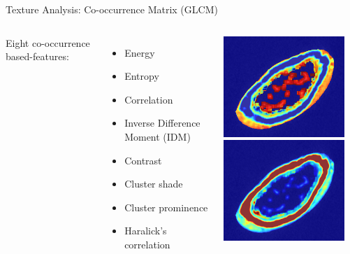 \documentclass[10pt,aspectratio=169]{beamer}
\begin{document}
\begin{frame}{Texture Analysis: Co-occurrence Matrix (GLCM)}
  \begin{columns}[onlytextwidth]
    Eight co-occurrence based-features:
    \begin{itemize} \itemsep0.5em
      \item Energy
      \item Entropy
      \item Correlation
      \item Inverse Difference Moment (IDM)
      \item Contrast
      \item Cluster shade
      \item Cluster prominence
      \item Haralick’s correlation
    \end{itemize}
    \begin{columns}
    \centering
    \centering
    \includegraphics[width=0.9\textwidth]{./TextureMapsImages/GLRLM_49_LEFT_0_crop.png}\\
    \includegraphics[width=0.9\textwidth]{./TextureMapsImages/GLRLM_49_LEFT_2_crop.png}

\end{columns}
\end{columns}
\end{frame}
\end{document}
